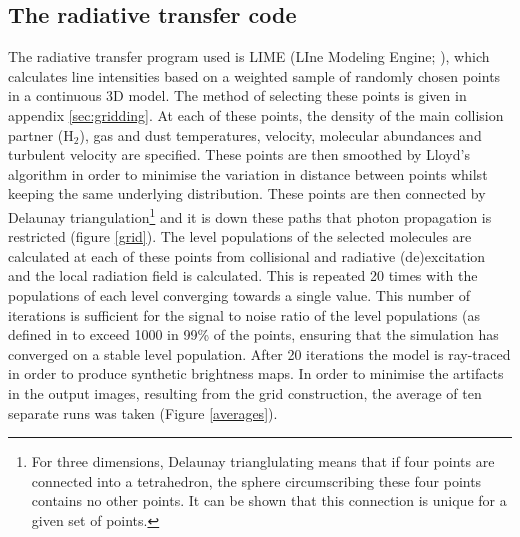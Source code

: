 \documentclass[useAMS,usenatbib]{mn2e}
\begin{document}
\subsection{The radiative transfer code} \label{subsec:radiative_transfer_code}
The radiative transfer program used is LIME (LIne Modeling Engine; \cite{Brinch2010}), which  calculates line intensities based on a weighted sample of randomly chosen points in a continuous 3D model. The method of selecting these points is given in appendix  \ref{sec:gridding}. At each of these points, the density of the main collision partner (H$_2$), gas and dust temperatures, velocity, molecular abundances and turbulent velocity are specified. These points are then smoothed by Lloyd's algorithm \citep{Lloyd1982} in order to minimise the variation in distance between points whilst keeping the same underlying distribution. These points are then connected by Delaunay triangulation\footnote{For three dimensions, Delaunay trianglulating means that if four points are connected into a tetrahedron, the sphere circumscribing these four points contains no other points. It can be shown that this connection is unique for a given set of points.} and it is down these paths that photon propagation is restricted (figure \ref{grid}). The level populations of the selected molecules are calculated at each of these points from collisional and radiative (de)excitation and the local radiation field is calculated. This is repeated 20 times with the populations of each level converging towards a single value. This number of iterations is sufficient for the signal to noise ratio of the level populations (as defined in \cite{Brinch2010} to exceed 1000 in 99\% of the points, ensuring that the simulation has converged on a stable level population. After 20 iterations the model is ray-traced in order to produce synthetic brightness maps. In order to minimise the artifacts in the output images, resulting from the grid construction, the average of ten separate runs was taken (Figure \ref{averages}).
\end{document}
